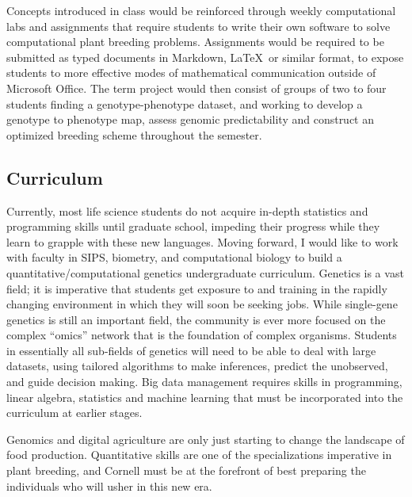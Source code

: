 \documentclass[11pt]{article}
\begin{document}
Concepts introduced in class would be reinforced through weekly computational labs and assignments that require students to write their own software to solve computational plant breeding problems. Assignments would be required to be submitted as typed documents in Markdown, \LaTeX\ or similar format, to expose students to more effective modes of mathematical communication outside of Microsoft Office. The term project would then consist of groups of two to four students finding a genotype-phenotype dataset, and working to develop a genotype to phenotype map, assess genomic predictability and construct an optimized breeding scheme throughout the semester. 


\subsection*{Curriculum}

Currently, most life science students do not acquire in-depth statistics and programming skills until graduate school, impeding their progress while they learn to grapple with these new languages. Moving forward, I would like to work with faculty in SIPS, biometry, and computational biology to build a quantitative/computational genetics undergraduate curriculum. Genetics is a vast field; it is imperative that students get exposure to and training in the rapidly changing environment in which they will soon be seeking jobs. While single-gene genetics is still an important field, the community is ever more focused on the complex ``omics'' network that is the foundation of complex organisms. Students in essentially all sub-fields of genetics will need to be able to deal with large datasets, using tailored algorithms to make inferences, predict the unobserved, and guide decision making. Big data management requires skills in programming, linear algebra, statistics and machine learning that must be incorporated into the curriculum at earlier stages.



Genomics and digital agriculture are only just starting to change the landscape of food production. Quantitative skills are one of the specializations imperative in plant breeding, and Cornell must be at the forefront of best preparing the individuals who will usher in this new era.
\end{document}
